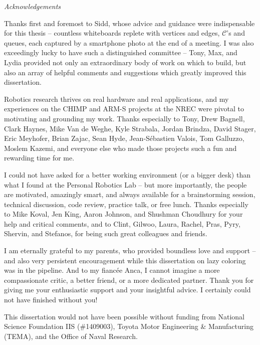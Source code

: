 
\begin{fullwidth}
\begin{adjustwidth}{1in}{1in}

\vphantom{.}

\vspace{0.2in}

{\LARGE \emph{Acknowledgements}}

\vspace{0.2in}

Thanks first and foremost to Sidd,
whose advice and guidance were indispensable for
this thesis
-- countless whiteboards replete with
vertices and edges, $\mathcal{C}$'s and queues,
each captured by a smartphone photo at the end of a meeting.
I was also exceedingly lucky to have such a distinguished
committee --
Tony, Max, and Lydia provided not only an extraordinary body of work
on which to build,
but also an array of helpful comments and suggestions which greatly
improved this dissertation.

\vspace{0.2cm}

Robotics research thrives on real hardware and real applications,
and my experiences on the CHIMP and ARM-S projects
at the NREC were pivotal to motivating and grounding my work.
Thanks especially to Tony, Drew Bagnell,
Clark Haynes, Mike Van de Weghe, Kyle Strabala, Jordan Brindza,
David Stager, Eric Meyhofer, Brian Zajac, Sean Hyde,
Jean-S\'{e}bastien Valois, Tom Galluzzo, Moslem Kazemi,
and everyone else who made those projects such a fun and rewarding
time for me.

\vspace{0.2cm}

I could not have asked for a better working environment
(or a bigger desk)
than what I found at the Personal Robotics Lab
-- but more importantly,
the people are motivated, amazingly smart, and always available
for a brainstorming session, technical discussion, code review,
practice talk, or free lunch.
Thanks especially to Mike Koval, Jen King, Aaron Johnson,
and Shushman Choudhury for your help and critical comments,
and to Clint, Gilwoo, Laura, Rachel, Pras, Pyry, Shervin, and Stefanos,
for being such great colleagues and friends.

\vspace{0.2cm}

I am eternally grateful to my parents,
who provided boundless love and support
-- and also very persistent encouragement
while this dissertation on lazy coloring was in the pipeline.
And to my fianc\'{e}e Anca,
I cannot imagine
a more compassionate critic,
a better friend,
or a more dedicated partner.
Thank you for giving me your enthusiastic support
and your insightful advice.
I certainly could not have finished without you!

\vspace{3.5cm} 

\noindent
This dissertation would not have been possible without funding from
National Science Foundation IIS (\#1409003),
Toyota Motor Engineering \& Manufacturing (TEMA),
and the Office of Naval Research.

\end{adjustwidth}
\end{fullwidth}
